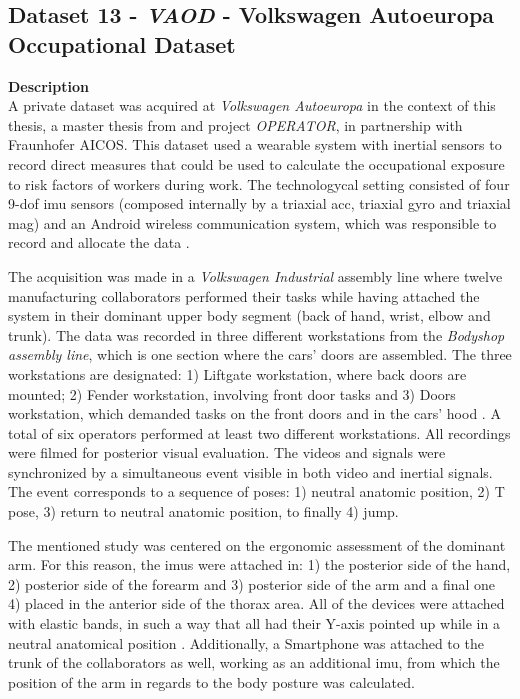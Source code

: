 \subsection{Dataset 13 - \textit{VAOD} - Volkswagen Autoeuropa Occupational Dataset}
\label{dat:dataset_industry}
\textbf{Description}\hfill \\
A private dataset was acquired at \textit{Volkswagen Autoeuropa} in the context of this thesis, a master thesis from \cite{santos2019} and project \textit{OPERATOR}, in partnership with Fraunhofer AICOS. This dataset used a wearable system with inertial sensors to record direct measures that could be used to calculate the occupational exposure to risk factors of workers during work. The technologycal setting consisted of four 9-\gls{dof} \gls{imu} sensors (composed internally by a triaxial \gls{acc}, triaxial \gls{gyro} and triaxial \gls{mag}) and an Android wireless communication system, which was responsible to record and allocate the data \cite{santos2019}.
\par
The acquisition was made in a \textit{Volkswagen Industrial} assembly line where twelve manufacturing collaborators performed their tasks while having attached the system in their dominant upper body segment (back of hand, wrist, elbow and trunk). The data was recorded in three different workstations from the \textit{Bodyshop assembly line}, which is one section where the cars' doors are assembled. The three workstations are designated: 1) Liftgate workstation, where back doors are mounted; 2) Fender workstation, involving front door tasks and 3) Doors workstation, which demanded tasks on the front doors and in the cars' hood \cite{santos2019}. A total of six operators performed at least two different workstations. All recordings were filmed for posterior visual evaluation. The videos and signals were synchronized by a simultaneous event visible in both video and inertial signals. The event corresponds to a sequence of poses: 1) neutral anatomic position, 2) T pose, 3) return to neutral anatomic position, to finally 4) jump.

The mentioned study was centered on the ergonomic assessment of the dominant arm. For this reason, the \gls{imu}s  were attached in: 1) the posterior side of the hand, 2) posterior side of the forearm and 3) posterior side of the arm and a final one 4) placed in the anterior side of the thorax area. All of the devices were attached with elastic bands, in such a way that all had their Y-axis pointed up while in a neutral anatomical position \cite{santos2019}. Additionally, a Smartphone was attached to the trunk of the collaborators as well, working as an additional \gls{imu}, from which the position of the arm in regards to the body posture was calculated.

